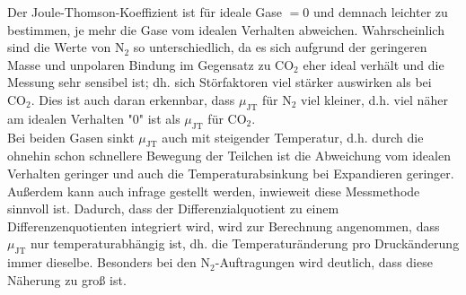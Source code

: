 \documentclass[a4paper,12pt,oneside,onecolum,final,openany]{report}
\begin{document}
Der Joule-Thomson-Koeffizient ist für ideale Gase $=0$ und demnach leichter zu bestimmen, je mehr die Gase vom idealen Verhalten abweichen. Wahrscheinlich sind die Werte von $\mathrm{N}_2$ so unterschiedlich, da es sich aufgrund der geringeren Masse und unpolaren Bindung im Gegensatz zu $\mathrm{CO}_2$ eher ideal verhält und die Messung sehr sensibel ist; dh. sich Störfaktoren viel stärker auswirken als bei $\mathrm{CO}_2$. Dies ist auch daran erkennbar, dass $\mu_\mathrm{JT}$ für $\mathrm{N}_2$ viel kleiner, d.h. viel näher am idealen Verhalten "0" ist als $\mu_\mathrm{JT}$ für $\mathrm{CO}_2$.\\
Bei beiden Gasen sinkt $\mu_\mathrm{JT}$ auch mit steigender Temperatur, d.h. durch die ohnehin schon schnellere Bewegung der Teilchen ist die Abweichung vom idealen Verhalten geringer und auch die Temperaturabsinkung bei Expandieren geringer.\\
 Außerdem kann auch infrage gestellt werden, inwieweit diese Messmethode sinnvoll ist. Dadurch, dass der Differenzialquotient zu einem Differenzenquotienten integriert wird, wird zur Berechnung angenommen, dass $\mu_\mathrm{JT}$ nur temperaturabhängig ist, dh. die Temperaturänderung pro Druckänderung immer dieselbe. Besonders bei den $\mathrm{N}_2$-Auftragungen wird deutlich, dass diese Näherung zu groß ist.\\ 
 
\end{document}
